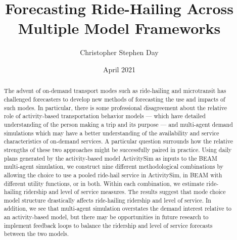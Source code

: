 \documentclass[simple, masters, twoside]{byuthesis}
\title{Forecasting Ride-Hailing Across\\
\hspace*{0.333em}Multiple Model Frameworks}
\author{Christopher Stephen Day}
\date{April 2021}
\begin{document}
	\frontmatter

	\titlepage
	\clearpage

	\customtitlepage
	\clearpage


    \begin{abstract}
  The advent of on-demand transport modes such as ride-hailing and microtransit has challenged forecasters to develop new methods of forecasting the use and impacts of such modes. In particular, there is some professional disagreement about the relative role of activity-based transportation behavior models --- which have detailed understanding of the person making a trip and its purpose --- and multi-agent demand simulations which may have a better understanding of the availability and service characteristics of on-demand services. A particular question surrounds how the relative strengths of these two approaches might be successfully paired in practice. Using daily plans generated by the activity-based model ActivitySim as inputs to the BEAM multi-agent simulation, we construct nine different methodological combinations by allowing the choice to use a pooled ride-hail service in ActivitySim, in BEAM with different utility functions, or in both. Within each combination, we estimate ride-hailing ridership and level of service measures. The results suggest that mode choice model structure drastically affects ride-hailing ridership and level of service. In addition, we see that multi-agent simulation overstates the demand interest relative to an activity-based model, but there may be opportunities in future research to implement feedback loops to balance the ridership and level of service forecasts between the two models.
  \end{abstract}
  	\clearpage
\end{document}
